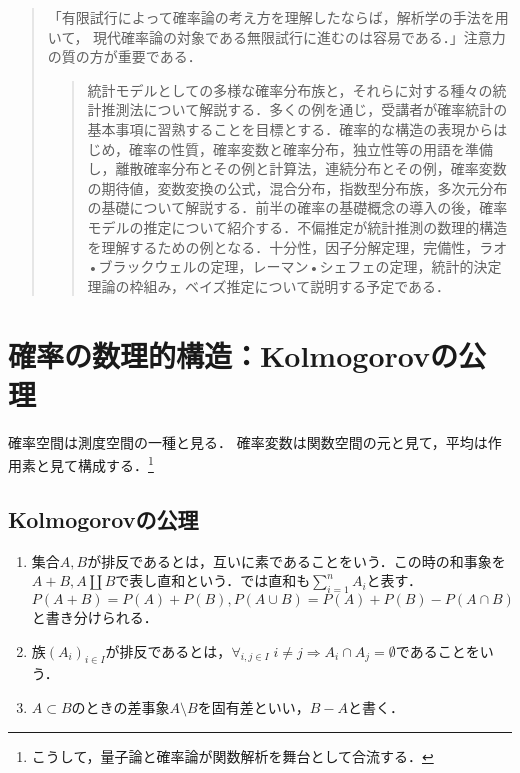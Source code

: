 \documentclass[uplatex,dvipdfmx]{jsreport}
\begin{document}
\begin{quotation}
    「有限試行によって確率論の考え方を理解したならば，解析学の手法を用いて，
    現代確率論の対象である無限試行に進むのは容易である．」注意力の質の方が重要である．
    \begin{quote}
        統計モデルとしての多様な確率分布族と，それらに対する種々の統計推測法について解説する．多くの例を通じ，受講者が確率統計の基本事項に習熟することを目標とする．確率的な構造の表現からはじめ，確率の性質，確率変数と確率分布，独立性等の用語を準備し，離散確率分布とその例と計算法，連続分布とその例，確率変数の期待値，変数変換の公式，混合分布，指数型分布族，多次元分布の基礎について解説する．前半の確率の基礎概念の導入の後，確率モデルの推定について紹介する．不偏推定が統計推測の数理的構造を理解するための例となる．十分性，因子分解定理，完備性，ラオ•ブラックウェルの定理，レーマン•シェフェの定理，統計的決定理論の枠組み，ベイズ推定について説明する予定である．
    \end{quote}
\end{quotation}

\section{確率の数理的構造：Kolmogorovの公理}

\begin{tcolorbox}[colframe=ForestGreen, colback=ForestGreen!10!white,breakable,colbacktitle=ForestGreen!40!white,coltitle=black,fonttitle=\bfseries\sffamily,
title=測度論的確率論という枠組み]
    確率空間は測度空間の一種と見る．
    確率変数は関数空間の元と見て，平均は作用素と見て構成する．\footnote{こうして，量子論と確率論が関数解析を舞台として合流する．}
\end{tcolorbox}

\subsection{Kolmogorovの公理}

\begin{notation}\mbox{}
    \begin{enumerate}
        \item 集合$A,B$が排反であるとは，互いに素であることをいう．この時の和事象を$A+B,A\coprod B$で表し直和という．\cite{伊藤清}では直和も$\sum_{i=1}^n A_i$と表す．$P(A+B)=P(A)+P(B),P(A\cup B)=P(A)+P(B)-P(A\cap B)$と書き分けられる．
        \item 族$(A_i)_{i\in I}$が排反であるとは，$\forall_{i,j\in I}\;i\ne j\Rightarrow A_i\cap A_j=\emptyset$であることをいう．
        \item $A\subset B$のときの差事象$A\setminus B$を固有差といい，$B-A$と書く．
    \end{enumerate}
\end{notation}
\end{document}
